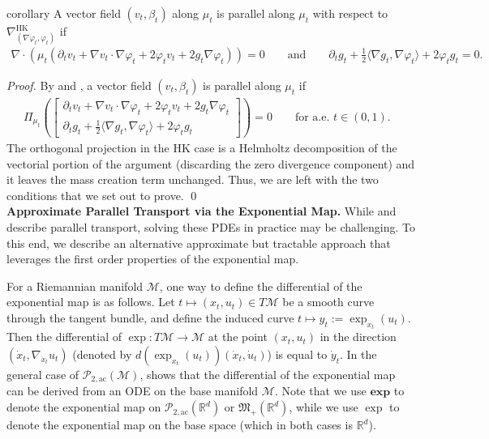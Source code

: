 \documentclass{article}
\newcommand{\man}{\mathcal{M}}
\newcommand{\pac}{\mathcal{P}_{2, \text{ac}}(\mathbb{R}^d)}
\newcommand{\posm}{\mathfrak{M}_+(\mathbb{R}^d)}
\begin{document}
\begin{restatable}{corollary}{} \label{HK parallel transport pde}
    A vector field $(v_t, \beta_t)$ along $\mu_t$ is parallel along $\mu_t$ with respect to $\nabla_{(\nabla\varphi_t, \varphi_t)}^{\text{HK}}$ if
    \begin{align*}
        \boxed{\nabla \cdot (\mu_t (\partial_tv_t + \nabla v_t \cdot \nabla \varphi_t + 2\varphi_t v_t + 2g_t \nabla\varphi_t)) = 0 
        \qquad \text{and} \qquad 
        \partial_tg_t + \frac{1}{2}\langle\nabla g_t, \nabla\varphi_t\rangle + 2\varphi_t g_t = 0.}
    \end{align*}
\end{restatable}
\noindent \textit{Proof.} By  and , a vector field $(v_t, \beta_t)$ is parallel along $\mu_t$ if
\begin{align}
    \Pi_{\mu_t}\left(\begin{bmatrix}
        \partial_tv_t + \nabla v_t\cdot \nabla\varphi_t + 2\varphi_tv_t +  2g_t\nabla\varphi_t \\
        \partial_tg_t + \frac{1}{2}\langle\nabla g_t, \nabla\varphi_t\rangle + 2\varphi_t g_t
    \end{bmatrix}\right) = 0 \qquad \text{for a.e. $t \in (0,1).$ }
\end{align}
The orthogonal projection in the HK case is a Helmholtz decomposition of the vectorial portion of the argument (discarding the zero divergence component) and it leaves the mass creation term unchanged. Thus, we are left with the two conditions that we set out to prove. \qed{}
\\

\noindent \textbf{Approximate Parallel Transport via the Exponential Map.}
While  and  describe parallel transport, solving these PDEs in practice may be challenging. To this end, we describe an alternative approximate but tractable approach that leverages the first order properties of the exponential map. 

For a Riemannian manifold $\man$, one way to define the differential of the exponential map is as follows. Let $t \mapsto (x_t, u_t) \in T\man$ be a smooth curve through the tangent bundle, and define the induced curve $t \mapsto y_t := \exp_{x_t}(u_t).$ Then the differential of $\exp : T\man \rightarrow \man$ at the point $(x_t, u_t)$ in the direction $(\dot x_t, \nabla_{\dot x_t}u_t)$ (denoted by $d(\exp_{x_t}(u_t))(\dot x_t,  \dot u_t)$) is equal to $\dot y_t.$ In the general case of $\mathcal{P}_{2, \text{ac}}(\man)$, \citet{gigli2012second} shows that the differential of the exponential map can be derived from an ODE on the base manifold $\man$. Note that we use $\textbf{exp}$ to denote the exponential map on $\pac$ or $\posm$, while we use $\exp$ to denote the exponential map on the base space (which in both cases is $\mathbb{R}^d$). 
\end{document}
